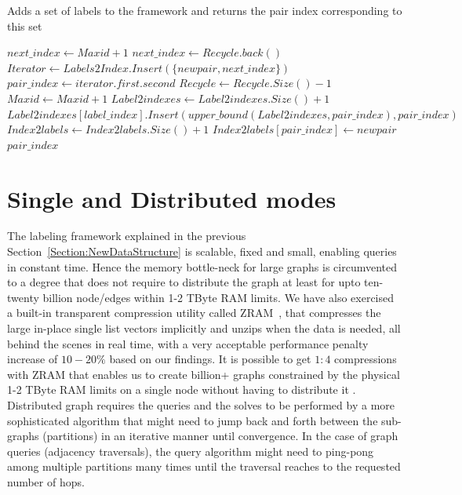 \documentclass[preprint,3p,twocolumn]{elsarticle}
\begin{document}
\begin{algorithm*}
\caption{Adds a set of labels to the framework and returns the pair index corresponding to this set}
\begin{algorithmic}[1]
\State $next\_index \gets Maxid+1$
  \State $next\_index \gets Recycle.back()$
\EndIf  
\State $Iterator \gets Labels2Index.Insert(\{newpair, next\_index\})$
\State $pair\_index \gets iterator.first.second$ 
 
          \State $Recycle \gets Recycle.Size()-1$
    \Else
          \State $Maxid \gets Maxid + 1$
    \EndIf        
          \State $Label2indexes \gets Label2indexes.Size() + 1$        
       \EndIf
       \State $Label2indexes[label\_index].Insert(upper\_bound(Label2indexes,pair\_index),pair\_index)$
    \EndFor
       \State $Index2labels \gets Index2labels.Size() + 1$
    \EndIf
    \State $Index2labels[pair\_index] \gets newpair$         
\EndIf   
\State \Return $pair\_index$
\EndProcedure
\end{algorithmic}
\label{Algorithm:addlabel}
\end{algorithm*}

\section{Single and Distributed modes}
\label{Section:Parallelism}

The labeling framework explained in the previous Section~\ref{Section:NewDataStructure} is scalable, fixed and small, enabling queries in constant time. Hence the memory bottle-neck for large graphs is circumvented to a degree that does not require to distribute the graph at least for upto ten-twenty billion node/edges within 1-2 TByte RAM limits. We have also exercised a built-in transparent compression utility called ZRAM~\cite{zram}, that compresses the large in-place single list vectors implicitly and unzips when the data is needed, all behind the scenes in real time, with a very acceptable performance penalty increase of $10-20 \%$ based on our findings. It is possible to get $1\colon4$ compressions with ZRAM that enables us to create billion+ graphs constrained by the physical 1-2 TByte RAM limits on a single node without having to distribute it . Distributed graph requires the queries and the solves to be performed by a more sophisticated algorithm that might need to jump back and forth between the sub-graphs (partitions) in an iterative manner until convergence. In the case of graph queries (adjacency traversals), the query algorithm might need to ping-pong among multiple partitions many times until the traversal reaches to the requested number of hops. 
\end{document}
